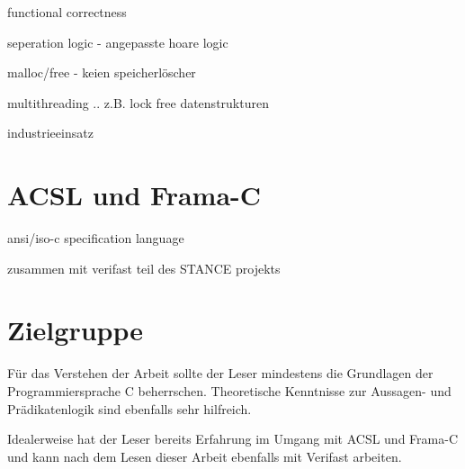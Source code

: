functional correctness


seperation logic - angepasste hoare logic


malloc/free - keien speicherlöscher


multithreading .. z.B. lock free datenstrukturen


industrieeinsatz

\section{ACSL und Frama-C}
\label{acsl-und-frama-c}

ansi/iso-c specification language


zusammen mit verifast teil des STANCE projekts

\section{Zielgruppe}
\label{sec:zielgruppe}

Für das Verstehen der Arbeit sollte der Leser mindestens die Grundlagen der Programmiersprache C beherrschen.
Theoretische Kenntnisse zur Aussagen- und Prädikatenlogik sind ebenfalls sehr hilfreich.

Idealerweise hat der Leser bereits Erfahrung im Umgang mit ACSL und Frama-C und kann nach dem Lesen dieser Arbeit
ebenfalls mit Verifast arbeiten. 